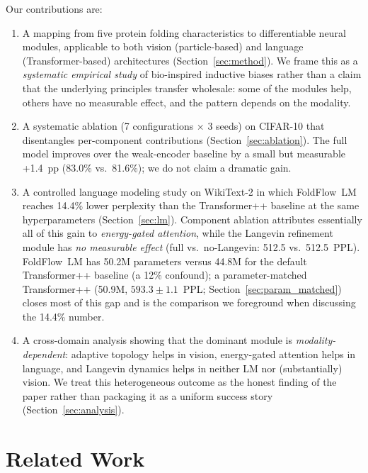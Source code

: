 \documentclass[10pt]{article}
\begin{document}
Our contributions are:
\begin{enumerate}
  \item A mapping from five protein folding characteristics to
    differentiable neural modules, applicable to both vision
    (particle-based) and language (Transformer-based) architectures
    (Section~\ref{sec:method}).  We frame this as a \emph{systematic
    empirical study} of bio-inspired inductive biases rather than a
    claim that the underlying principles transfer wholesale: some of
    the modules help, others have no measurable effect, and the
    pattern depends on the modality.
  \item A systematic ablation (7 configurations $\times$ 3 seeds) on
    CIFAR-10 that disentangles per-component contributions
    (Section~\ref{sec:ablation}).  The full model improves over the
    weak-encoder baseline by a small but measurable +1.4~pp
    (83.0\% vs.\ 81.6\%); we do not claim a dramatic gain.
  \item A controlled language modeling study on WikiText-2 in which
    FoldFlow~LM reaches 14.4\% lower perplexity than the
    Transformer++ baseline at the same hyperparameters
    (Section~\ref{sec:lm}).  Component ablation attributes essentially
    all of this gain to \emph{energy-gated attention}, while the
    Langevin refinement module has \emph{no measurable effect}
    (full vs.\ no-Langevin: 512.5 vs.\ 512.5~PPL).  FoldFlow~LM has
    50.2M parameters versus 44.8M for the default Transformer++
    baseline (a 12\% confound); a parameter-matched Transformer++
    (50.9M, $593.3 \pm 1.1$~PPL; Section~\ref{sec:param_matched})
    closes most of this gap and is the comparison we foreground when
    discussing the 14.4\% number.
  \item A cross-domain analysis showing that the dominant module is
    \emph{modality-dependent}: adaptive topology helps in vision,
    energy-gated attention helps in language, and Langevin dynamics
    helps in neither LM nor (substantially) vision.  We treat this
    heterogeneous outcome as the honest finding of the paper rather
    than packaging it as a uniform success story
    (Section~\ref{sec:analysis}).
\end{enumerate}

\section{Related Work}
\label{sec:related}
\end{document}
